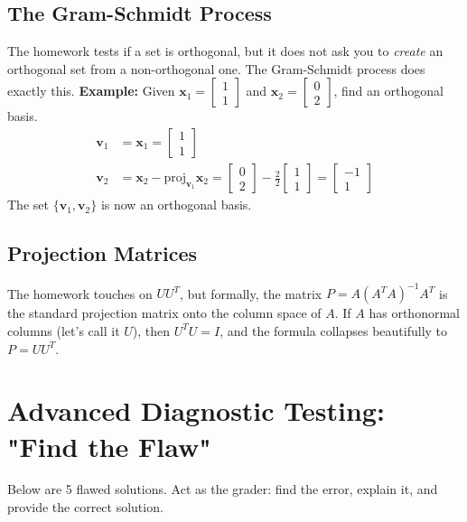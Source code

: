 \documentclass[11pt, letterpaper]{article}
\theoremstyle{definition}
\theoremstyle{remark}
\begin{document}
\subsection{The Gram-Schmidt Process}
The homework tests if a set is orthogonal, but it does not ask you to \textit{create} an orthogonal set from a non-orthogonal one. The Gram-Schmidt process does exactly this.
\textbf{Example:} Given $\mathbf{x}_1 = \begin{bmatrix} 1 \\ 1 \end{bmatrix}$ and $\mathbf{x}_2 = \begin{bmatrix} 0 \\ 2 \end{bmatrix}$, find an orthogonal basis.
\begin{align*}
    \mathbf{v}_1 &= \mathbf{x}_1 = \begin{bmatrix} 1 \\ 1 \end{bmatrix} \\
    \mathbf{v}_2 &= \mathbf{x}_2 - \text{proj}_{\mathbf{v}_1} \mathbf{x}_2 = \begin{bmatrix} 0 \\ 2 \end{bmatrix} - \frac{2}{2} \begin{bmatrix} 1 \\ 1 \end{bmatrix} = \begin{bmatrix} -1 \\ 1 \end{bmatrix}
\end{align*}
The set $\{\mathbf{v}_1, \mathbf{v}_2\}$ is now an orthogonal basis.

\subsection{Projection Matrices}
The homework touches on $U U^T$, but formally, the matrix $P = A(A^T A)^{-1} A^T$ is the standard projection matrix onto the column space of $A$. If $A$ has orthonormal columns (let's call it $U$), then $U^T U = I$, and the formula collapses beautifully to $P = U U^T$.

\section{Advanced Diagnostic Testing: "Find the Flaw"}

Below are 5 flawed solutions. Act as the grader: find the error, explain it, and provide the correct solution.
\end{document}
